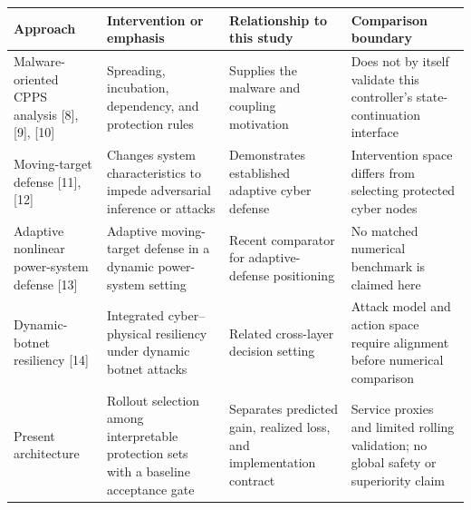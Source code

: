 \documentclass[10pt]{article}
\makeatletter
\newenvironment{exporttable}{\par\noindent\begin{minipage}{\linewidth}\def\@captype{table}}{\end{minipage}\par}
\makeatother
\begin{document}
\renewcommand{\thetable}{S\arabic{table}}
\setcounter{table}{0}
\begin{exporttable}
\centering\small
\caption{Positioning against representative defense approaches. The comparison describes problem scope, not an empirical performance ranking.}
\label{tab:related_comparison}
\begin{tabularx}{\textwidth}{p{}XXX}
\toprule
Approach & Intervention or emphasis & Relationship to this study & Comparison boundary\\
\midrule
Malware-oriented CPPS analysis [8], [9], [10] & Spreading, incubation, dependency, and protection rules & Supplies the malware and coupling motivation & Does not by itself validate this controller's state-continuation interface\\
Moving-target defense [11], [12] & Changes system characteristics to impede adversarial inference or attacks & Demonstrates established adaptive cyber defense & Intervention space differs from selecting protected cyber nodes\\
Adaptive nonlinear power-system defense [13] & Adaptive moving-target defense in a dynamic power-system setting & Recent comparator for adaptive-defense positioning & No matched numerical benchmark is claimed here\\
Dynamic-botnet resiliency [14] & Integrated cyber--physical resiliency under dynamic botnet attacks & Related cross-layer decision setting & Attack model and action space require alignment before numerical comparison\\
Present architecture & Rollout selection among interpretable protection sets with a baseline acceptance gate & Separates predicted gain, realized loss, and implementation contract & Service proxies and limited rolling validation; no global safety or superiority claim\\
\bottomrule
\end{tabularx}
\end{exporttable}
\clearpage
\setcounter{table}{1}
\end{document}
